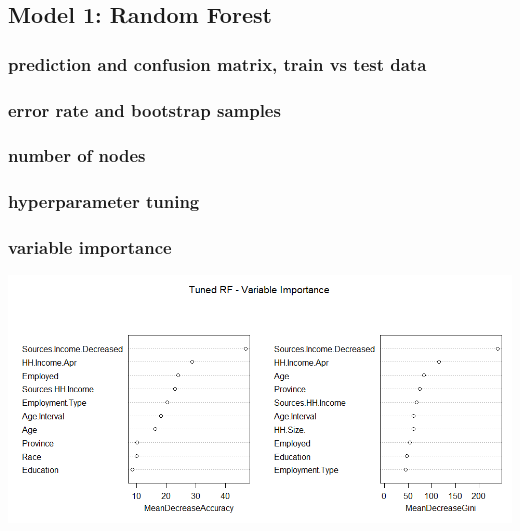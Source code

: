 \documentclass[11pt,preprint, authoryear]{elsarticle}
\let\origfigure\figure
\let\endorigfigure\endfigure
\renewenvironment{figure}[1][2] {
    \expandafter\origfigure\expandafter[H]
} {
    \endorigfigure
}
\numberwithin{equation}{section}
\numberwithin{figure}{section}
\numberwithin{table}{section}
\begin{document}
\hypertarget{model-1-random-forest}{%
\subsection{Model 1: Random Forest}\label{model-1-random-forest}}

\hypertarget{prediction-and-confusion-matrix-train-vs-test-data}{%
\subsubsection*{prediction and confusion matrix, train vs test
data}\label{prediction-and-confusion-matrix-train-vs-test-data}}

\hypertarget{error-rate-and-bootstrap-samples}{%
\subsubsection*{error rate and bootstrap
samples}\label{error-rate-and-bootstrap-samples}}

\hypertarget{number-of-nodes}{%
\subsubsection*{number of nodes}\label{number-of-nodes}}

\hypertarget{hyperparameter-tuning}{%
\subsubsection*{hyperparameter tuning}\label{hyperparameter-tuning}}

\hypertarget{variable-importance}{%
\subsubsection*{variable importance}\label{variable-importance}}

\begin{figure}[H]
\includegraphics[width=1\linewidth]{Figures/rf3_impplot} \caption{\label{varimprf1} - RF Tuned Model}\label{fig:varimprf1}
\end{figure}
\end{document}
